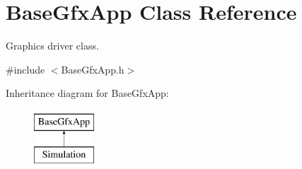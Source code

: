 \hypertarget{classBaseGfxApp}{\section{Base\-Gfx\-App Class Reference}
\label{classBaseGfxApp}
}


Graphics driver class.  




{\ttfamily \#include $<$Base\-Gfx\-App.\-h$>$}

Inheritance diagram for Base\-Gfx\-App\-:\begin{figure}[H]
\begin{center}
\leavevmode
\includegraphics[height=2.000000cm]{classBaseGfxApp}
\end{center}
\end{figure}
